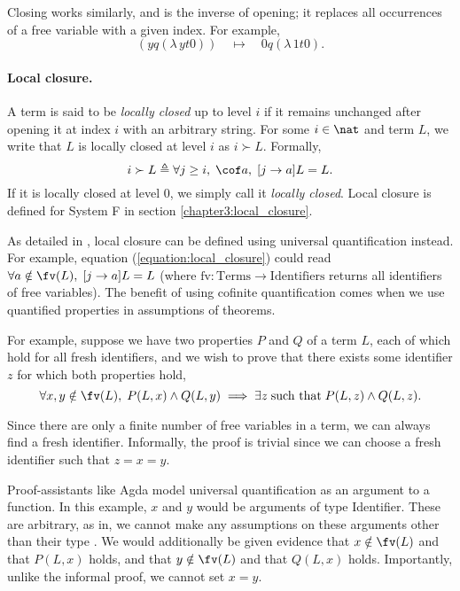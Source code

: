 Closing works similarly, and is the inverse of opening; it replaces all occurrences of a free
variable with a given index. For example,
\begin{equation*}
  [0 \leftarrow y] (y q (\lambda \, y t 0)) \quad \mapsto \quad 0 q (\lambda \, 1 t 0).
\end{equation*}

\paragraph*{Local closure.} A term is said to be \textit{locally closed} up to level $i$ if it
remains unchanged after opening it at index $i$ with an arbitrary string. For some $i \in \nat$ and
term $L$, we write that $L$ is locally closed at level $i$ as $i \succ L$. Formally,
\begin{equation}
  \label{equation:local_closure}
  i \succ L \triangleq \forall j \geq i, \; \cof a , \; [j \to a] L = L.
\end{equation}
If it is locally closed at level $0$, we simply call it \textit{locally closed}. Local closure is
defined for System F in section \ref{chapter3:local_closure}.

As detailed in \citet{aydemir_engineering_2008}, local closure can be defined using universal
quantification instead. For example, equation (\ref{equation:local_closure}) could read $\forall a
\notin \fv(L), \; [j \to a] L = L$ (where $\text{fv} \colon \text{Terms} \to \text{Identifiers}$
returns all identifiers of free variables). The benefit of using cofinite quantification comes when
we use quantified properties in assumptions of theorems.

For example, suppose we have two properties $P$ and $Q$ of a term $L$, each of which hold for all
fresh identifiers, and we wish to prove that there exists some identifier $z$ for which both
properties hold,
\begin{equation*}
  \forall x, y \notin \fv(L), \; P(L, x) \wedge Q(L, y)
    \implies \exists z \; \text{such that} \; P(L, z) \wedge Q(L, z).
\end{equation*}

Since there are only a finite number of free variables in a term, we can always find a fresh
identifier. Informally, the proof is trivial since we can choose a fresh identifier such that $z = x
= y$.

Proof-assistants like Agda model universal quantification as an argument to a function. In this
example, $x$ and $y$ would be arguments of type Identifier. These are arbitrary, as in, we cannot
make any assumptions on these arguments other than their type
\citep[chapter~Quantifier]{wadler_programming_2022}. We would additionally be given evidence that $x
\notin \fv(L)$ and that $P(L, x)$ holds, and that $y \notin \fv(L)$ and that $Q(L, x)$ holds.
Importantly, unlike the informal proof, we cannot set $x = y$.

